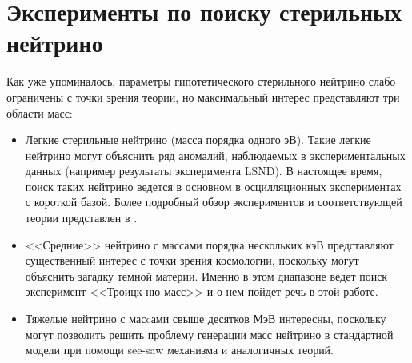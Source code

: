 \documentclass[a4paper,14pt]{extreport}
\begin{document}


\chapter{Эксперименты по поиску стерильных нейтрино}

Как уже упоминалось, параметры гипотетического стерильного нейтрино слабо ограничены с точки зрения теории, но максимальный интерес представляют три области масс:
\begin{itemize}
    \item Легкие стерильные нейтрино (масса порядка одного эВ). Такие легкие нейтрино могут объяснить ряд аномалий, наблюдаемых в экспериментальных данных (например результаты эксперимента LSND\cite{hep-ex/9504009}). В настоящее время, поиск таких нейтрино ведется в основном в осцилляционных экспериментах с короткой базой. Более подробный обзор экспериментов и соответствующей теории представлен в \cite{light-sterile-neutrino-whitepaper}.
    
    \item <<Средние>> нейтрино с массами порядка нескольких кэВ \cite{dm-kev-sterile-neutrino-whitepaper} представляют существенный интерес с точки зрения космологии, поскольку могут объяснить загадку темной материи. Именно в этом диапазоне ведет поиск эксперимент <<Троицк ню-масс>> и о нем пойдет речь в этой работе.
    
    \item Тяжелые нейтрино с масcами свыше десятков МэВ интересны, поскольку могут позволить решить проблему генерации масс нейтрино в стандартной модели при помощи see-saw механизма \cite{SeeSaw} и аналогичных теорий.
\end{itemize}
\end{document}
